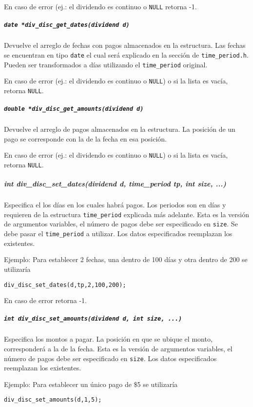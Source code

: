 \documentclass[12pt,a4paper,final]{article}
\begin{document}
				En caso de error (ej.: el dividendo es continuo o \texttt{NULL} retorna -1.

			\subparagraph{\texttt{date *div\_disc\_get\_dates(dividend d)}}
				Devuelve el arreglo de fechas con pagos almacenados en la estructura.
				Las fechas se encuentran en tipo \texttt{date} el cual será explicado
				en la sección de \texttt{time\_period.h}. Pueden ser transformados a días
				utilizando el \texttt{time\_period} original.

				En caso de error (ej.: el dividendo es continuo o \texttt{NULL}) o si
				la lista es vacía, retorna \texttt{NULL}.

			\subparagraph{\texttt{double *div\_disc\_get\_amounts(dividend d)}}
				Devuelve el arreglo de pagos almacenados en la estructura.
				La posición de un pago se corresponde con la de la fecha en esa posición.

				En caso de error (ej.: el dividendo es continuo o \texttt{NULL}) o si
				la lista es vacía, retorna \texttt{NULL}.

			\subparagraph{int div\_disc\_set\_dates(dividend d, time\_period tp, int size, ...)}
				Especifica el los días en los cuales habrá pagos. Los periodos son en días y requieren
				de la estructura \texttt{time\_period} explicada más adelante.
				Esta es la versión de argumentos variables, el número de pagos debe ser especificado
				en \texttt{size}. Se debe pasar el \texttt{time\_period} a utilizar. Los datos
				especificados reemplazan los existentes.

				Ejemplo: Para establecer 2 fechas, una dentro de 100 días y otra dentro de 200
					se utilizaría
					\begin{alltt}
						div_disc_set_dates(d, tp, 2, 100, 200);
					\end{alltt}

				En caso de error retorna -1.

			\subparagraph{\texttt{int div\_disc\_set\_amounts(dividend d, int size, ...)}}
				Especifica los montos a pagar. La posición en que se ubique el monto, corresponderá
				a la de la fecha. Esta es la versión de argumentos variables, el número de pagos debe ser
				especificado en \texttt{size}. Los datos especificados reemplazan los existentes.

				Ejemplo: Para establecer un único pago de \$5 se utilizaría
					\begin{alltt}
						div_disc_set_amounts(d, 1, 5);
					\end{alltt}
\end{document}

